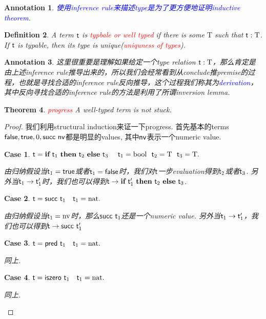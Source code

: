 \documentclass{article}
\theoremstyle{plain}
\newtheorem{theorem}{Theorem}
\newtheorem{definition}[theorem]{Definition}
\newtheorem{annotation}[theorem]{Annotation}
\newtheorem{case}{Case}
\theoremstyle{nonumberplain}
\newtheorem{proof}{Proof}
\newcommand{\termtype}[2]{\ensuremath{#1:#2}}
\newcommand{\term}[1]{\ensuremath\mathsf{#1}}
\newcommand{\true}{\term{true}}
\newcommand{\false}{\term{false}}
\newcommand{\ifelse}[3]{\ensuremath{\textbf{if}~#1~\textbf{then}~#2~\textbf{else}~#3}}
\newcommand{\succt}[1]{\term{succ}~#1}
\newcommand{\pred}[1]{\term{pred}~#1}
\newcommand{\iszero}[1]{\term{iszero}~#1}
\newcommand{\redt}[1]{\textcolor{red}{#1}}
\newcommand{\bluet}[1]{\textcolor{blue}{#1}}
\begin{document}
\begin{annotation}
\rm \bluet{使用inference rule来描述type是为了更方便地证明inductive theorem}.
\end{annotation}

\begin{definition}
\rm A term $\term{t}$ is \redt{typbale or well typed} if there is some $\text{T}$ such that $\termtype{\term{t}}{\text{T}}$. If $\term{t}$ is typable, then its type is unique(\redt{uniquness of types}). 
\end{definition}

\begin{annotation}
\rm 这里很重要是理解如果给定一个type relation $\termtype{\term{t}}{\text{T}}$，那么肯定是由上述inference rule推导出来的，所以我们会经常看到从conclude推premise的过程，也就是寻找合适的inference rule反向推导，这个过程我们称其为\bluet{derivation}，其中反向寻找合适的inference rule的方法是利用了所谓inversion lemma. 
\end{annotation}

\begin{theorem}
\rm \redt{progress} A well-typed term is not stuck.
\end{theorem}

\begin{proof}
\rm 我们利用structural induction来证一下progress. 首先基本的terms $\false, \true, 0, \succt{\term{nv}}$都是明显的values, 其中$\term{nv}$表示一个numeric value. 

\begin{case}
$\term{t} = \ifelse{\term{t}_1}{\term{t}_2}{\term{t}_3} ~~~~ \term{t}_1 = \text{bool} ~~ \term{t}_2 = \text{T} ~~ \term{t}_3 = \text{T}.$

由归纳假设当$\term{t}_1 = \true$或者$\term{t}_1 = \false$时，我们对$\term{t}$一步evaluation得到$\term{t}_2$或者$\term{t}_3$.  另外当$\term{t}_1 \to \term{t}_1'$时，我们也可以得到$\term{t} \to \ifelse{\term{t}_1'}{\term{t}_2}{\term{t}_3}$. 
\end{case} 

\begin{case}
$\term{t} = \succt{\term{t}_1} ~~~ \term{t}_1 = \text{nat}.$

由归纳假设当$\term{t}_1 = \text{nv}$时，那么$\succt{\term{t}_1}$还是一个numeric value. 另外当$\term{t}_1 \to \term{t}_1'$，我们也可以得到$\term{t} \to \succt{\term{t}_1'}$
\end{case} 

\begin{case}
$\term{t} = \pred{\term{t}_1}~~~ \term{t}_1 = \text{nat}.$

同上.
\end{case} 

\begin{case}
$\term{t} = \iszero{\term{t}_1}~~~ \term{t}_1 = \text{nat}.$

同上.
\end{case}
\end{proof}
\end{document}
